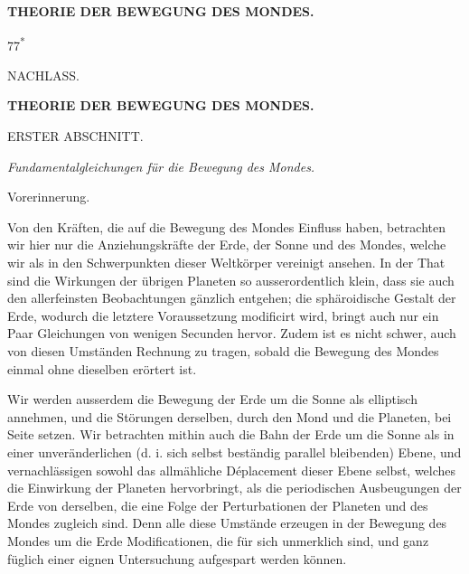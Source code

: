 \clearpage
\begingroup
{}
\renewcommand{\headrulewidth}{0pt}
\clearpage
{}
\begin{center}
\vspace*{.15\textheight}
{\Large\bfseries THEORIE DER BEWEGUNG DES MONDES.\par}
\end{center}
\vspace{.28\textheight}
\par\noindent\hfill 77\textsuperscript{*}\par

\clearpage
{}
\begin{center}
{\large NACHLASS.\par}
\bigskip
{\Large\bfseries THEORIE DER BEWEGUNG DES MONDES.\par}
\bigskip
ERSTER ABSCHNITT.
\medskip

\textit{Fundamentalgleichungen für die Bewegung des Mondes.}
\bigskip

{\large Vorerinnerung.\par}
\end{center}

\par\noindent\hspace*{\parindent}Von den Kräften, die auf die Bewegung des Mondes Einfluss haben, betrachten
wir hier nur die Anziehungskräfte der Erde, der Sonne und des Mondes, welche
wir als in den Schwerpunkten dieser Weltkörper vereinigt ansehen. In der
That sind die Wirkungen der übrigen Planeten so ausserordentlich klein, dass
sie auch den allerfeinsten Beobachtungen gänzlich entgehen; die sphäroidische
Gestalt der Erde, wodurch die letztere Voraussetzung modificirt wird, bringt
auch nur ein Paar Gleichungen von wenigen Secunden hervor. Zudem ist es
nicht schwer, auch von diesen Umständen Rechnung zu tragen, sobald die
Bewegung des Mondes einmal ohne dieselben erörtert ist.

\par\noindent\hspace*{\parindent}Wir werden ausserdem die Bewegung der Erde um die Sonne als elliptisch
annehmen, und die Störungen derselben, durch den Mond und die Planeten, bei
Seite setzen. Wir betrachten mithin auch die Bahn der Erde um die Sonne als
in einer unveränderlichen (d. i. sich selbst beständig parallel bleibenden)
Ebene, und vernachlässigen sowohl das allmähliche Déplacement
dieser Ebene selbst, welches die Einwirkung der Planeten hervorbringt,
als die periodischen Ausbeugungen der Erde von derselben, die eine Folge der
Perturbationen der Planeten und des Mondes zugleich sind. Denn alle diese
Umstände erzeugen in der Bewegung des Mondes um die Erde Modificationen, die
für sich unmerklich sind, und ganz füglich einer eignen Untersuchung
aufgespart werden können.

